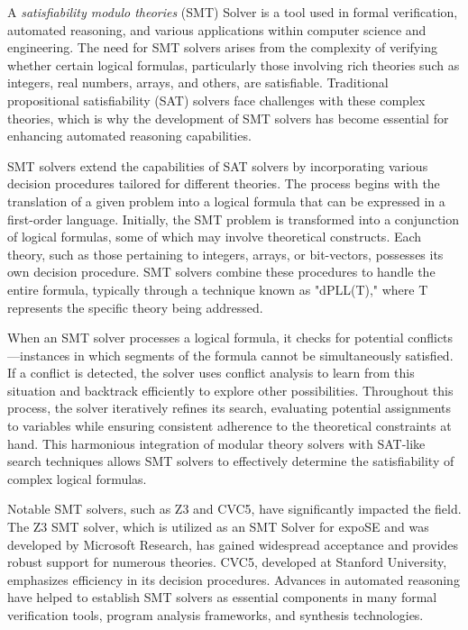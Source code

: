 A \textit{satisfiability modulo theories }(SMT) Solver is a tool used in formal verification, automated reasoning, and various applications within computer science and engineering. The need for SMT solvers arises from the complexity of verifying whether certain logical formulas, particularly those involving rich theories such as integers, real numbers, arrays, and others, are satisfiable. Traditional propositional satisfiability (SAT) solvers face challenges with these complex theories, which is why the development of SMT solvers has become essential for enhancing automated reasoning capabilities.

SMT solvers extend the capabilities of SAT solvers by incorporating various decision procedures tailored for different theories. The process begins with the translation of a given problem into a logical formula that can be expressed in a first-order language. Initially, the SMT problem is transformed into a conjunction of logical formulas, some of which may involve theoretical constructs. Each theory, such as those pertaining to integers, arrays, or bit-vectors, possesses its own decision procedure. SMT solvers combine these procedures to handle the entire formula, typically through a technique known as "dPLL(T)," where T represents the specific theory being addressed.


When an SMT solver processes a logical formula, it checks for potential conflicts—instances in which segments of the formula cannot be simultaneously satisfied. If a conflict is detected, the solver uses conflict analysis to learn from this situation and backtrack efficiently to explore other possibilities. Throughout this process, the solver iteratively refines its search, evaluating potential assignments to variables while ensuring consistent adherence to the theoretical constraints at hand. This harmonious integration of modular theory solvers with SAT-like search techniques allows SMT solvers to effectively determine the satisfiability of complex logical formulas.\cite{barrett_satisfiability_2009}



Notable SMT solvers, such as Z3 and CVC5, have significantly impacted the field. The Z3 SMT solver, which is utilized as an SMT Solver for expoSE and was developed by Microsoft Research, has gained widespread acceptance and provides robust support for numerous theories. CVC5, developed at Stanford University, emphasizes efficiency in its decision procedures. Advances in automated reasoning have helped to establish SMT solvers as essential components in many formal verification tools, program analysis frameworks, and synthesis technologies.\cite{barrett_satisfiability_2009}


